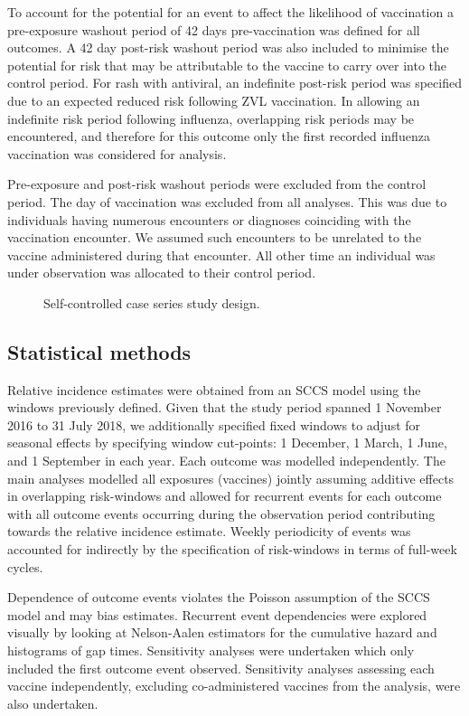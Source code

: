 \documentclass[review, endfloat]{elsarticle}
\begin{document}
To account for the potential for an event to affect the likelihood of vaccination a pre-exposure washout period of 42 days pre-vaccination was defined for all outcomes. A 42 day post-risk washout period was also included to minimise the potential for risk that may be attributable to the vaccine to carry over into the control period. For rash with antiviral, an indefinite post-risk period was specified due to an expected reduced risk following ZVL vaccination. In allowing an indefinite risk period following influenza, overlapping risk periods may be encountered, and therefore for this outcome only the first recorded influenza vaccination was considered for analysis.

Pre-exposure and post-risk washout periods were excluded from the control period. The day of vaccination was excluded from all analyses. This was due to individuals having numerous encounters or diagnoses coinciding with the vaccination encounter. We assumed such encounters to be unrelated to the vaccine administered during that encounter. All other time an individual was under observation was allocated to their control period.

\begin{figure}
\caption{Self-controlled case series study design.}
\label{fig:sccs_design}
\end{figure}

\subsection{Statistical methods}
\label{sec:stat_methods}

Relative incidence estimates were obtained from an SCCS model \citep{farrington2018} using the windows previously defined. Given that the study period spanned 1 November 2016 to 31 July 2018, we additionally specified fixed windows to adjust for seasonal effects by specifying window cut-points: 1 December, 1 March, 1 June, and 1 September in each year. Each outcome was modelled independently. The main analyses modelled all exposures (vaccines) jointly assuming additive effects in overlapping risk-windows and allowed for recurrent events for each outcome with all outcome events occurring during the observation period contributing towards the relative incidence estimate. Weekly periodicity of events was accounted for indirectly by the specification of risk-windows in terms of full-week cycles.

Dependence of outcome events violates the Poisson assumption of the SCCS model and may bias estimates. Recurrent event dependencies were explored visually by looking at Nelson-Aalen estimators for the cumulative hazard and histograms of gap times. Sensitivity analyses were undertaken which only included the first outcome event observed.  Sensitivity analyses assessing each vaccine independently, excluding co-administered vaccines from the analysis, were also undertaken. 
\end{document}
